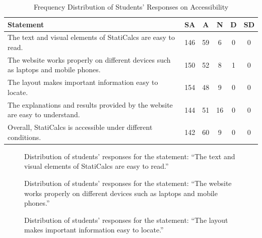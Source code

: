 
\begin{table}[H]
\centering
\caption{Frequency Distribution of Students’ Responses on Accessibility}
\renewcommand{\arraystretch}{1.3}
\begin{tabular}{p{8cm}ccccc}
\hline
\textbf{Statement} & \textbf{SA} & \textbf{A} & \textbf{N} & \textbf{D} & \textbf{SD}\\
\hline
The text and visual elements of StatiCalcs are easy to read. & 146 & 59 & 6 & 0 & 0\\
The website works properly on different devices such as laptops and mobile phones. & 150 & 52 & 8 & 1 & 0\\
The layout makes important information easy to locate. & 154 & 48 & 9 & 0 & 0\\
The explanations and results provided by the website are easy to understand. & 144 & 51 & 16 & 0 & 0\\
Overall, StatiCalcs is accessible under different conditions. & 142 & 60 & 9 & 0 & 0\\
\hline
\end{tabular}
\end{table}


\begin{figure}[H]
\centering
{}
\caption{Distribution of students' responses for the statement: ``The text and visual elements of StatiCalcs are easy to read.''}
\end{figure}


\begin{figure}[H]
\centering
{}
\caption{Distribution of students' responses for the statement: ``The website works properly on different devices such as laptops and mobile phones.''}
\end{figure}


\begin{figure}[H]
\centering
{}
\caption{Distribution of students' responses for the statement: ``The layout makes important information easy to locate.''}
\end{figure}


